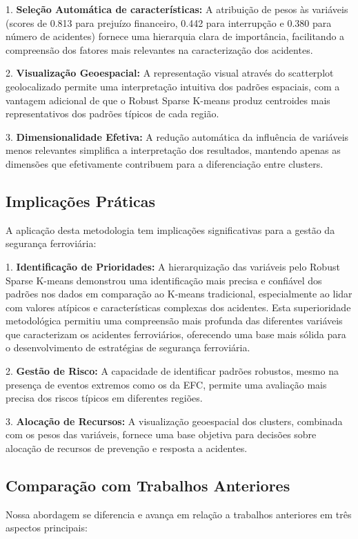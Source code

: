 \documentclass[conference]{IEEEtran}
\begin{document}
1. \textbf{Seleção Automática de características:} A atribuição de pesos às variáveis (scores de 0.813 para prejuízo financeiro, 0.442 para interrupção e 0.380 para número de acidentes) fornece uma hierarquia clara de importância, facilitando a compreensão dos fatores mais relevantes na caracterização dos acidentes.

2. \textbf{Visualização Geoespacial:} A representação visual através do scatterplot geolocalizado permite uma interpretação intuitiva dos padrões espaciais, com a vantagem adicional de que o Robust Sparse K-means produz centroides mais representativos dos padrões típicos de cada região.

3. \textbf{Dimensionalidade Efetiva:} A redução automática da influência de variáveis menos relevantes simplifica a interpretação dos resultados, mantendo apenas as dimensões que efetivamente contribuem para a diferenciação entre clusters.

\subsection{Implicações Práticas}
A aplicação desta metodologia tem implicações significativas para a gestão da segurança ferroviária:

1. \textbf{Identificação de Prioridades:} A hierarquização das variáveis pelo Robust Sparse K-means demonstrou uma identificação mais precisa e confiável dos padrões nos dados em comparação ao K-means tradicional, especialmente ao lidar com valores atípicos e características complexas dos acidentes. Esta superioridade metodológica permitiu uma compreensão mais profunda das diferentes variáveis que caracterizam os acidentes ferroviários, oferecendo uma base mais sólida para o desenvolvimento de estratégias de segurança ferroviária.

2. \textbf{Gestão de Risco:} A capacidade de identificar padrões robustos, mesmo na presença de eventos extremos como os da EFC, permite uma avaliação mais precisa dos riscos típicos em diferentes regiões.

3. \textbf{Alocação de Recursos:} A visualização geoespacial dos clusters, combinada com os pesos das variáveis, fornece uma base objetiva para decisões sobre alocação de recursos de prevenção e resposta a acidentes.

\subsection{Comparação com Trabalhos Anteriores}
Nossa abordagem se diferencia e avança em relação a trabalhos anteriores em três aspectos principais:
\end{document}
